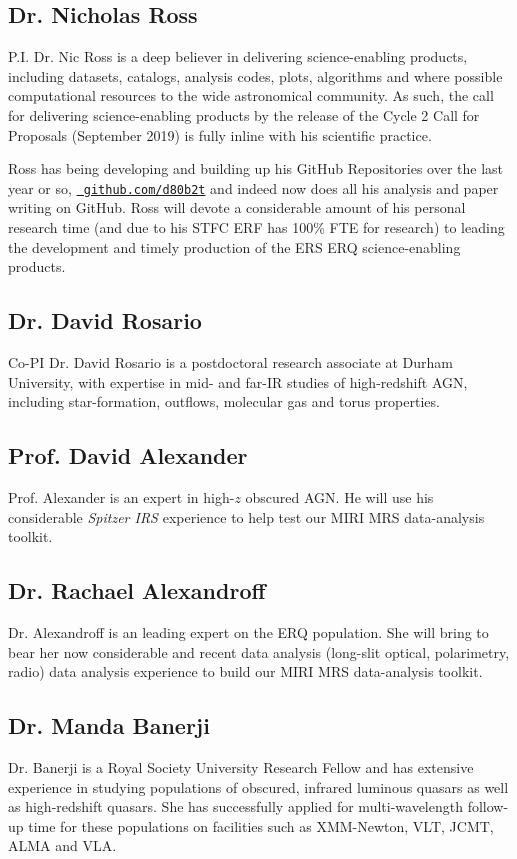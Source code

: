 \documentclass[11pt,a4paper]{article}
\begin{document}
\subsection*{Dr. Nicholas Ross}
P.I. Dr. Nic Ross is a deep believer in delivering science-enabling
products, including datasets, catalogs, analysis codes, plots,
algorithms and where possible computational resources to the wide
astronomical community.  As such, the call for delivering
science-enabling products by the release of the Cycle 2 Call for
Proposals (September 2019) is fully inline with his scientific
practice.

\smallskip \smallskip
\noindent
Ross has being developing and building up his GitHub Repositories over
the last year or so, \href{https://github.com/d80b2t}{\tt
github.com/d80b2t} and indeed now does all his analysis and paper
writing on GitHub.
Ross will devote a considerable amount of his personal research time
(and due to his STFC ERF has 100\% FTE for research) to leading the
development and timely production of the ERS ERQ science-enabling
products.


\subsection*{Dr. David Rosario} 
Co-PI Dr. David Rosario is a postdoctoral research associate at Durham
University, with expertise in mid- and far-IR studies of high-redshift
AGN, including star-formation, outflows, molecular gas and torus
properties.


\subsection*{Prof. David Alexander} 
Prof. Alexander is an expert in high-$z$ obscured AGN.  He will use his
considerable {\it Spitzer IRS} experience to help test our MIRI MRS
data-analysis toolkit.


\subsection*{Dr. Rachael Alexandroff} 
Dr. Alexandroff is an leading expert on the ERQ population.  She will
bring to bear her now considerable and recent data analysis (long-slit
optical, polarimetry, radio) data analysis experience to build our
MIRI MRS data-analysis toolkit.


\subsection*{Dr. Manda Banerji}
Dr. Banerji is a Royal Society University Research Fellow and has
extensive experience in studying populations of obscured, infrared
luminous quasars as well as high-redshift quasars. She has
successfully applied for multi-wavelength follow-up time for these
populations on facilities such as XMM-Newton, VLT, JCMT, ALMA and
VLA.
\end{document}
